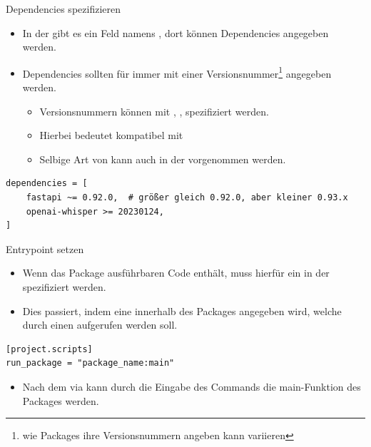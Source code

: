 \documentclass[12pt, aspectratio=169, usepdftitle=false]{beamer}
\begin{document}
\begin{frame}[fragile]{Dependencies spezifizieren}
	\begin{itemize}
		\item In der  gibt es ein Feld namens , dort können Dependencies angegeben werden.
		\item Dependencies sollten für  immer mit einer Versionsnummer\footnote{wie Packages ihre Versionsnummern angeben kann variieren} angegeben werden.
		\begin{itemize}
			\item Versionsnummern können mit \lpl{==}, \lpl{>=},  \lpl{\~=} spezifiziert werden.
			\item Hierbei bedeutet \lpl{\~=} \glqq kompatibel mit\grqq
			\item Selbige Art von  kann auch in der  vorgenommen werden.
		\end{itemize}
	\end{itemize}
	
	
	\begin{lstlisting}[language=pytiny]
dependencies = [
    fastapi ~= 0.92.0,  # größer gleich 0.92.0, aber kleiner 0.93.x
    openai-whisper >= 20230124,
]
	\end{lstlisting}
%
\end{frame}

\begin{frame}[fragile]{Entrypoint setzen}
	\begin{itemize}
		\item Wenn das Package  ausführbaren Code enthält, muss hierfür ein  in der  spezifiziert werden.
		\item Dies passiert, indem eine  innerhalb des Packages angegeben wird, welche durch einen  aufgerufen werden soll.
	\end{itemize}
	
	
	\begin{lstlisting}[language=pytiny]
[project.scripts]
run_package = "package_name:main"
	\end{lstlisting}
	
	
\begin{itemize}
	\item Nach dem  via  kann durch die Eingabe des Commands  die main-Funktion des Packages   werden.
\end{itemize}
	
\end{frame}
\end{document}
